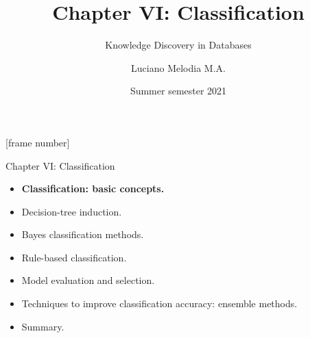 \documentclass[aspectratio=169,t,table]{beamer}
\title[KDD]{Chapter VI: Classification}
\subtitle{Knowledge Discovery in Databases}
\author[L.~Melodia]{Luciano Melodia M.A.}
\institute[Department]{Evolutionary Data Management, Friedrich-Alexander University Erlangen-Nürnberg}
\date{Summer semester 2021}
\begin{document}
  \maketitle

  {
    [frame number]
    \begin{frame}{Chapter VI: Classification}
        \begin{itemize}
            \item \textbf{Classification: basic concepts.}
            \item Decision-tree induction.
            \item Bayes classification methods.
            \item Rule-based classification.
            \item Model evaluation and selection.
            \item Techniques to improve classification accuracy: ensemble methods.
            \item Summary.
        \end{itemize}
    \end{frame}
  }
\end{document}
